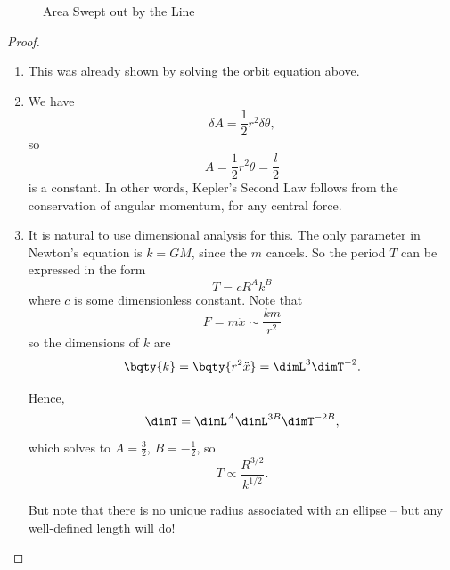 \begin{figure}[ht!]
    \centering

    \caption{Area Swept out by the Line}
    \label{fig:area-swept-out-by-line}%
\end{figure}

\begin{proof}
    \begin{enumerate}
        \item This was already shown by solving the orbit equation above.
        \item We have
        \begin{equation}
            \delta A = \frac{1}{2} r^2 \delta \theta,
        \end{equation}
        so
        \begin{equation}
            \boxed{\dot{A}} = \frac{1}{2} r^2 \dot{\theta} = \boxed{\frac{l}{2}}
        \end{equation}
        is a constant. In other words, Kepler's Second Law follows from the conservation of angular momentum, for any central force.
        \item It is natural to use dimensional analysis for this. The only parameter in Newton's equation is \(k = GM\), since the \(m\) cancels. So the period \(T\) can be expressed in the form
        \begin{equation}
            T = c R^A k^B
        \end{equation}
        where \(c\) is some dimensionless constant. Note that
        \begin{equation}
            F = m \ddot{x} \sim \frac{km}{r^2}
        \end{equation}
        so the dimensions of \(k\) are
        \begin{equation}
            \bqty{k} = \bqty{r^2 \ddot{x}} = \dimL^3 \dimT^{-2}.
        \end{equation}

        Hence,
        \begin{equation}
            \dimT = \dimL^A \dimL^{3B} \dimT^{-2B},
        \end{equation}
        which solves to \(A = \frac{3}{2}\), \(B = -\frac{1}{2}\), so
        \begin{equation}
            \boxed{T \propto \frac{R^{3 / 2}}{k^{1 / 2}}.}
        \end{equation}

        But note that there is no unique radius associated with an ellipse -- but any well-defined length will do!


\end{enumerate}
\end{proof}
